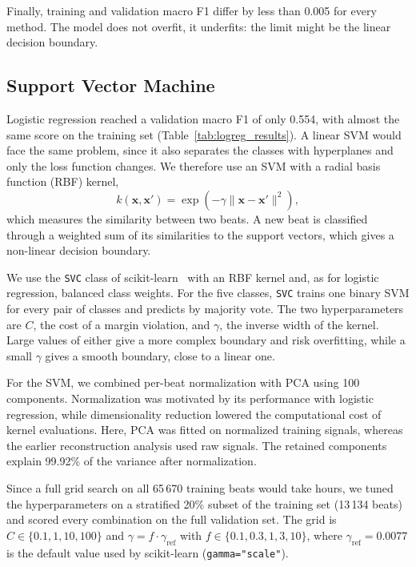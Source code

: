 \documentclass[11pt,oneside,a4paper]{article}
\begin{document}
    Finally, training and validation macro F1 differ by less than
    0.005 for every method. The model does not overfit, it
    underfits: the limit might be the linear decision boundary.

    \subsection{Support Vector Machine}

    Logistic regression reached a validation macro F1 of only
    0.554, with almost the same score on the training set
    (Table~\ref{tab:logreg_results}).
    A linear SVM would face the same problem, since it also
    separates the classes with hyperplanes and only the loss
    function changes. We therefore use an SVM with a radial basis
    function (RBF) kernel,
    \begin{equation}
        k(\mathbf{x}, \mathbf{x}') =
        \exp\left(-\gamma \lVert \mathbf{x} - \mathbf{x}' \rVert^2\right),
    \end{equation}
    which measures the similarity between two beats. A new beat is
    classified through a weighted sum of its similarities to the
    support vectors, which gives a non-linear decision boundary.

    We use the \texttt{SVC} class of scikit-learn~\cite{sklearn_docs} with an RBF kernel
    and, as for logistic regression, balanced class weights.
    For the five classes, \texttt{SVC} trains one binary SVM for
    every pair of classes and predicts by majority vote.
    The two hyperparameters are $C$, the cost of a margin
    violation, and $\gamma$, the inverse width of the kernel.
    Large values of either give a more complex boundary and risk
    overfitting, while a small $\gamma$ gives a smooth boundary,
    close to a linear one.

    For the SVM, we combined per-beat normalization with PCA
    using 100 components. Normalization was motivated by its
    performance with logistic regression, while dimensionality
    reduction lowered the computational cost of kernel evaluations.
    Here, PCA was fitted on normalized training signals,
    whereas the earlier reconstruction analysis used raw signals.
    The retained components explain 99.92\% of the variance
    after normalization.

    Since a full grid search on all 65\,670 training beats would
    take hours, we tuned the hyperparameters on a stratified 20\%
    subset of the training set (13\,134 beats) and scored every
    combination on the full validation set. The grid is
    $C \in \{0.1, 1, 10, 100\}$ and
    $\gamma = f \cdot \gamma_{\mathrm{ref}}$ with
    $f \in \{0.1, 0.3, 1, 3, 10\}$, where
    $\gamma_{\mathrm{ref}} = 0.0077$ is the default value used by
    scikit-learn (\texttt{gamma="scale"}).
\end{document}
